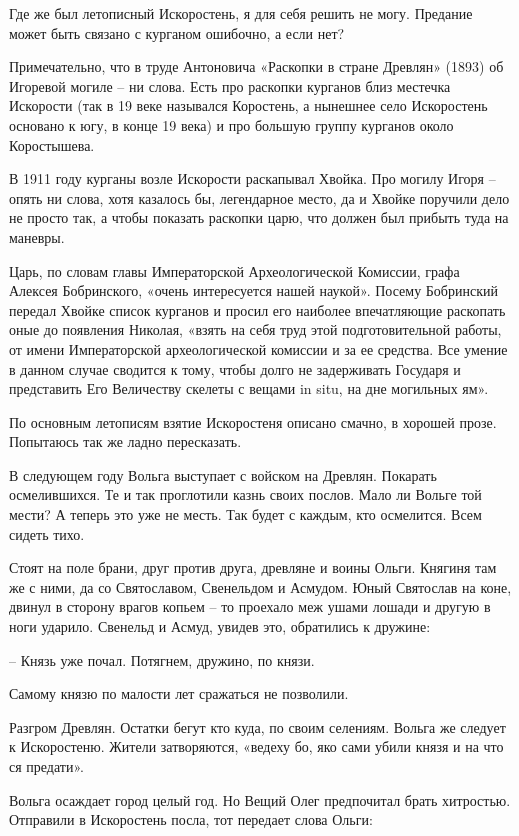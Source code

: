 Где же был летописный Искоростень, я для себя решить не могу. Предание может быть связано с курганом ошибочно, а если нет? 

Примечательно, что в труде Антоновича «Раскопки в стране Древлян» (1893) об Игоревой могиле – ни слова. Есть про раскопки курганов близ местечка Искорости (так в 19 веке назывался Коростень, а нынешнее село Искоростень основано к югу, в конце 19 века) и про большую группу курганов около Коростышева. 

В 1911 году курганы возле Искорости раскапывал Хвойка. Про могилу Игоря – опять ни слова, хотя казалось бы, легендарное место, да и Хвойке поручили дело не просто так, а чтобы показать раскопки царю, что должен был прибыть туда на маневры.

Царь, по словам главы Императорской Археологической Комиссии, графа Алексея Бобринского, «очень интересуется нашей наукой». Посему Бобринский передал Хвойке список курганов и просил его наиболее впечатляющие раскопать оные до появления Николая, «взять на себя труд этой подготовительной работы, от имени Императорской археологической комиссии и за ее средства. Все умение в данном случае сводится к тому, чтобы долго не задерживать Государя и представить Его Величеству скелеты с вещами in situ, на дне могильных ям». 

По основным летописям взятие Искоростеня описано смачно, в хорошей прозе. Попытаюсь так же ладно пересказать.

В следующем году Вольга выступает с войском на Древлян. Покарать осмелившихся. Те и так проглотили казнь своих послов. Мало ли Вольге той мести? А теперь это уже не месть. Так будет с каждым, кто осмелится. Всем сидеть тихо.

Стоят на поле брани, друг против друга, древляне и воины Ольги. Княгиня там же с ними, да со Святославом, Свенельдом и Асмудом. Юный Святослав на коне, двинул в сторону врагов копьем – то проехало меж ушами лошади и другую в ноги ударило. Свенельд и Асмуд, увидев это, обратились к дружине:

   – Князь уже почал. Потягнем, дружино, по князи.

Самому князю по малости лет сражаться не позволили.

Разгром Древлян. Остатки бегут кто куда, по своим селениям. Вольга же следует к Искоростеню. Жители затворяются, «ведеху бо, яко сами убили князя и на что ся предати».

Вольга осаждает город целый год. Но Вещий Олег предпочитал брать хитростью. Отправили в Искоростень посла, тот передает слова Ольги:


